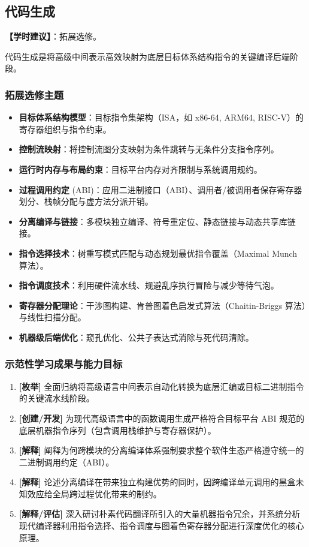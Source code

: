 \subsection{代码生成}
\textbf{【学时建议】}：拓展选修。

代码生成是将高级中间表示高效映射为底层目标体系结构指令的关键编译后端阶段。

\subsubsection{拓展选修主题}
\begin{itemize}
    \item \textbf{目标体系结构模型}：目标指令集架构（ISA，如 x86-64, ARM64, RISC-V）的寄存器组织与指令约束。
    \item \textbf{控制流映射}：将控制流图分支映射为条件跳转与无条件分支指令序列。
    \item \textbf{运行时内存与布局约束}：目标平台内存对齐限制与系统调用规约。
    \item \textbf{过程调用约定} (ABI)：应用二进制接口（ABI）、调用者/被调用者保存寄存器划分、栈帧分配与虚方法分派开销。
    \item \textbf{分离编译与链接}：多模块独立编译、符号重定位、静态链接与动态共享库链接。
    \item \textbf{指令选择技术}：树重写模式匹配与动态规划最优指令覆盖（Maximal Munch 算法）。
    \item \textbf{指令调度技术}：利用硬件流水线、规避乱序执行冒险与减少等待气泡。
    \item \textbf{寄存器分配理论}：干涉图构建、肯普图着色启发式算法（Chaitin-Briggs 算法）与线性扫描分配。
    \item \textbf{机器级后端优化}：窥孔优化、公共子表达式消除与死代码清除。
\end{itemize}

\subsubsection{示范性学习成果与能力目标}
\begin{enumerate}
    \item \textbf{[枚举]} 全面归纳将高级语言中间表示自动化转换为底层汇编或目标二进制指令的关键流水线阶段。
    \item \textbf{[创建/开发]} 为现代高级语言中的函数调用生成严格符合目标平台 ABI 规范的底层机器指令序列（包含调用栈维护与寄存器保护）。
    \item \textbf{[解释]} 阐释为何跨模块的分离编译体系强制要求整个软件生态严格遵守统一的二进制调用约定（ABI）。
    \item \textbf{[解释]} 论述分离编译在带来独立构建优势的同时，因跨编译单元调用的黑盒未知效应给全局跨过程优化带来的制约。
    \item \textbf{[解释/评估]} 深入研讨朴素代码翻译所引入的大量机器指令冗余，并系统分析现代编译器利用指令选择、指令调度与图着色寄存器分配进行深度优化的核心原理。
\end{enumerate}

